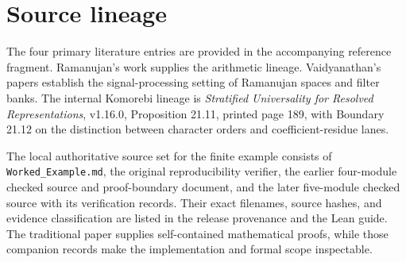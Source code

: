 \hypertarget{q:source-lineage}{%
\section*{Source lineage}\label{q:source-lineage}}

The four primary literature entries are provided in the accompanying
reference fragment. Ramanujan's work supplies the arithmetic lineage.
Vaidyanathan's papers establish the signal-processing setting of
Ramanujan spaces and filter banks. The internal Komorebi lineage is
\emph{Stratified Universality for Resolved Representations}, v1.16.0,
Proposition 21.11, printed page 189, with Boundary 21.12 on the
distinction between character orders and coefficient-residue lanes.

The local authoritative source set for the finite example consists of
\texttt{Worked\_Example.md}, the original reproducibility verifier, the
earlier four-module checked source and proof-boundary document, and the
later five-module checked source with its verification records. Their
exact filenames, source hashes, and evidence classification are listed
in the release provenance and the Lean guide. The traditional paper
supplies self-contained mathematical proofs, while those companion
records make the implementation and formal scope inspectable.



